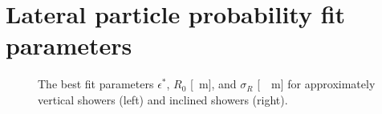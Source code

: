 \chapter{Lateral particle probability fit parameters}
\label{app:lpp-fit-parameters}

\begin{figure}[H]
	\centering
	\caption{The best fit parameters $\epsilon^*$, $R_0$ [\SI{}{\meter}], and $\sigma_R$ [\SI{}{\per\meter}] for approximately vertical showers (left) and inclined
    showers (right).}
	\label{fig:fitfunction-comparison}
\end{figure}





